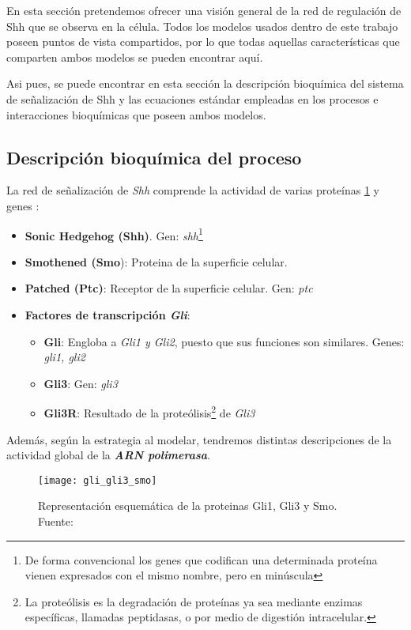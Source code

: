 En esta sección pretendemos ofrecer una visión general de la red de regulación de Shh que se observa en la célula. Todos los modelos usados dentro de este trabajo poseen puntos de vista compartidos, por lo que todas aquellas características que comparten ambos modelos se pueden encontrar aquí.
 
 Asi pues, se puede encontrar en esta sección la descripción bioquímica del sistema de señalización de Shh y las ecuaciones estándar empleadas en los procesos e interacciones bioquímicas que poseen ambos modelos.
 
 \subsection{Descripción bioquímica del proceso}
 
 La red de señalización de \textit{Shh} comprende la actividad de varias proteínas \ref{figuras} y genes :
 \begin{itemize}
 	\item \textbf{Sonic Hedgehog (Shh)}. Gen: \textit{shh}\footnote{ De forma convencional los genes que codifican una determinada proteína vienen expresados con el mismo nombre, pero en minúscula}
 	\item \textbf{Smothened (Smo}): Proteina de la superficie celular.  
 	\item \textbf{Patched (Ptc)}: Receptor de la superficie celular. Gen: \textit{ptc}
 	\item \textbf{Factores de transcripción \textit{Gli}}:
 	\begin{itemize}
 		\item \textbf{Gli}: Engloba a \textit{Gli1 y Gli2}, puesto que sus funciones son similares. Genes: \textit{gli1, gli2}
 		\item \textbf{Gli3}: Gen: \textit{gli3}
 		\item \textbf{Gli3R}: Resultado de la proteólisis\footnote{La proteólisis es la degradación de proteínas ya sea mediante enzimas específicas, llamadas peptidasas, o por medio de digestión intracelular.} de \textit{Gli3}
 	\end{itemize}
 \end{itemize}
  Además, según la estrategia al modelar, tendremos distintas descripciones de la actividad global de la \textbf{\textit{ARN polimerasa}}. 
 
 \begin{figure}[h]
 	\texttt{[image: gli\_gli3\_smo]}
 	\centering
 	\caption{Representación esquemática de la proteinas Gli1, Gli3 y Smo. Fuente: \cite{phosphosite}}
 	\label{figuras}
 \end{figure}
 
